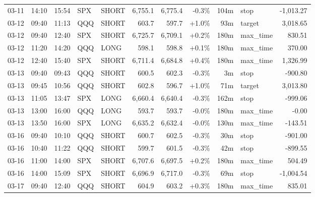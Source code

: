 \documentclass[11pt,a4paper,twoside]{article}
\begin{document}
\begin{center}
\begin{longtable}{>{\color{txtmain}}l l l l l r r r r >{\color{txtmain}}l r}
03-11 & 14:10 & 15:54 & SPX & SHORT & 6,755.1 & 6,775.4 & \textcolor{lossred}{-0.3\%} & 104m & stop & \textcolor{lossred}{-1,013.27} \\
03-12 & 09:40 & 11:13 & QQQ & SHORT & 603.7 & 597.7 & \textcolor{wingreen}{+1.0\%} & 93m & target & \textcolor{wingreen}{3,018.65} \\
03-12 & 09:40 & 12:40 & SPX & SHORT & 6,725.7 & 6,709.1 & \textcolor{wingreen}{+0.2\%} & 180m & max\_time & \textcolor{wingreen}{830.51} \\
03-12 & 11:20 & 14:20 & QQQ & LONG & 598.1 & 598.8 & \textcolor{wingreen}{+0.1\%} & 180m & max\_time & \textcolor{wingreen}{370.00} \\
03-12 & 12:40 & 15:40 & SPX & SHORT & 6,711.4 & 6,684.8 & \textcolor{wingreen}{+0.4\%} & 180m & max\_time & \textcolor{wingreen}{1,326.99} \\
03-13 & 09:40 & 09:43 & QQQ & SHORT & 600.5 & 602.3 & \textcolor{lossred}{-0.3\%} & 3m & stop & \textcolor{lossred}{-900.80} \\
03-13 & 09:45 & 10:56 & QQQ & SHORT & 602.8 & 596.7 & \textcolor{wingreen}{+1.0\%} & 71m & target & \textcolor{wingreen}{3,013.80} \\
03-13 & 11:05 & 13:47 & SPX & LONG & 6,660.4 & 6,640.4 & \textcolor{lossred}{-0.3\%} & 162m & stop & \textcolor{lossred}{-999.06} \\
03-13 & 13:00 & 16:00 & QQQ & LONG & 593.7 & 593.7 & \textcolor{lossred}{-0.0\%} & 180m & max\_time & \textcolor{lossred}{-0.00} \\
03-13 & 13:50 & 16:00 & SPX & LONG & 6,635.2 & 6,632.4 & \textcolor{lossred}{-0.0\%} & 130m & max\_time & \textcolor{lossred}{-143.51} \\
03-16 & 09:40 & 10:10 & QQQ & SHORT & 600.7 & 602.5 & \textcolor{lossred}{-0.3\%} & 30m & stop & \textcolor{lossred}{-901.00} \\
03-16 & 10:40 & 11:22 & QQQ & SHORT & 599.7 & 601.5 & \textcolor{lossred}{-0.3\%} & 42m & stop & \textcolor{lossred}{-899.55} \\
03-16 & 11:00 & 14:00 & SPX & SHORT & 6,707.6 & 6,697.5 & \textcolor{wingreen}{+0.2\%} & 180m & max\_time & \textcolor{wingreen}{504.49} \\
03-16 & 14:00 & 15:09 & SPX & SHORT & 6,696.9 & 6,717.0 & \textcolor{lossred}{-0.3\%} & 69m & stop & \textcolor{lossred}{-1,004.54} \\
03-17 & 09:40 & 12:40 & QQQ & SHORT & 604.9 & 603.2 & \textcolor{wingreen}{+0.3\%} & 180m & max\_time & \textcolor{wingreen}{835.01} \\

\end{longtable}
\end{center}
\end{document}
